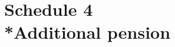 \documentclass[12pt,a4paper]{article}
\begin{document}
%
%
%
%
%
%
%
%
%
%
%
%
%
%
%
%


\part[Schedule 4 --- Additional pension]{Schedule 4\\*Additional pension}
\end{document}
